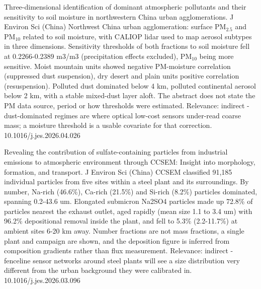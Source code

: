 \documentclass[10pt]{article}
\begin{document}
{Three-dimensional identification of dominant atmospheric pollutants and their sensitivity to soil moisture in northwestern China urban agglomerations.}
{J Environ Sci (China)}
{Northwest China urban agglomeration: surface PM$_{2.5}$ and PM$_{10}$ related to soil moisture, with CALIOP lidar used to map aerosol subtypes in three dimensions. Sensitivity thresholds of both fractions to soil moisture fell at 0.2266-0.2389 m3/m3 (precipitation effects excluded), PM$_{10}$ being more sensitive. Moist mountain units showed negative PM-moisture correlation (suppressed dust suspension), dry desert and plain units positive correlation (resuspension). Polluted dust dominated below 4 km, polluted continental aerosol below 2 km, with a stable mixed-dust layer aloft. The abstract does not state the PM data source, period or how thresholds were estimated. Relevance: indirect - dust-dominated regimes are where optical low-cost sensors under-read coarse mass; a moisture threshold is a usable covariate for that correction.}
{10.1016/j.jes.2026.04.026}

{Revealing the contribution of sulfate-containing particles from industrial emissions to atmospheric environment through CCSEM: Insight into morphology, formation, and transport.}
{J Environ Sci (China)}
{CCSEM classified 91,185 individual particles from five sites within a steel plant and its surroundings. By number, Na-rich (46.6\%), Ca-rich (21.5\%) and Si-rich (8.2\%) particles dominated, spanning 0.2-43.6 um. Elongated submicron Na2SO4 particles made up 72.8\% of particles nearest the exhaust outlet, aged rapidly (mean size 1.1 to 3.4 um) with 96.2\% depositional removal inside the plant, and fell to 5.3\% (2.2-11.7\%) at ambient sites 6-20 km away. Number fractions are not mass fractions, a single plant and campaign are shown, and the deposition figure is inferred from composition gradients rather than flux measurement. Relevance: indirect - fenceline sensor networks around steel plants will see a size distribution very different from the urban background they were calibrated in.}
{10.1016/j.jes.2026.03.096}
\end{document}
